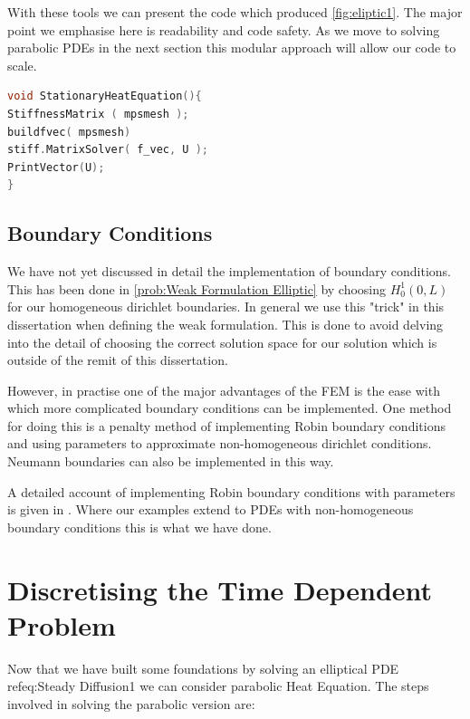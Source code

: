 \documentclass{uonmathreport}
\theoremstyle{definition}
\theoremstyle{problem}
\theoremstyle{theorem}
\begin{document}
With these tools we can present the code which produced \ref{fig:eliptic1}. The major point we emphasise here is readability and code safety. As we move to solving parabolic PDEs in the next section this modular approach will allow our code to scale.

\begin{lstlisting}[language=C++]
void StationaryHeatEquation(){
StiffnessMatrix ( mpsmesh );
buildfvec( mpsmesh)
stiff.MatrixSolver( f_vec, U );
PrintVector(U);
}
\end{lstlisting}

\subsection{Boundary Conditions} \label{BCs}
We have not yet discussed in detail the implementation of boundary conditions. This has been done in \ref{prob:Weak Formulation Elliptic} by choosing $H^1_0(0, L)$ for our homogeneous dirichlet boundaries.
In general we use this "trick" in this dissertation when defining the weak formulation. This is done to avoid delving into the detail of choosing the correct solution space for our solution which is outside of the remit of this dissertation.

However, in practise one of the major advantages of the FEM is the ease with which more complicated boundary conditions can be implemented. One method for doing this is a penalty method of implementing Robin boundary conditions and using parameters to approximate non-homogeneous dirichlet conditions. Neumann boundaries can also be implemented in this way.

A detailed account of implementing Robin boundary conditions with parameters is given in \cite{larson2013finite}. Where our examples extend to PDEs with non-homogeneous boundary conditions this is what we have done. 

\clearpage

\section{Discretising the Time Dependent Problem} \label{sec:Time dependent}



Now that we have built some foundations by solving an elliptical PDE ref{eq:Steady Diffusion1} we can consider parabolic Heat Equation. The steps involved in solving the parabolic version are:
\end{document}
